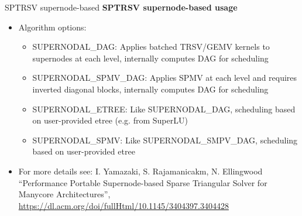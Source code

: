 \begin{frame}[fragile]{SPTRSV supernode-based}
\textbf{SPTRSV supernode-based usage}

  \begin{itemize}
    \item Algorithm options:
    \begin{itemize}
      \item SUPERNODAL\_DAG: Applies batched TRSV/GEMV kernels to supernodes at each level, internally computes DAG for scheduling
      \item SUPERNODAL\_SPMV\_DAG: Applies SPMV at each level and requires inverted diagonal blocks, internally computes DAG for scheduling
      \item SUPERNODAL\_ETREE: Like SUPERNODAL\_DAG, scheduling based on user-provided etree (e.g. from SuperLU)
      \item SUPERNODAL\_SPMV: Like SUPERNODAL\_SMPV\_DAG, scheduling based on user-provided etree
    \end{itemize}
    \item For more details see: \scriptsize{I. Yamazaki, S. Rajamanicakm, N. Ellingwood “Performance Portable Supernode-based Sparse Triangular Solver for Manycore Architectures”, \url{https://dl.acm.org/doi/fullHtml/10.1145/3404397.3404428}}
  \end{itemize}

\end{frame}

